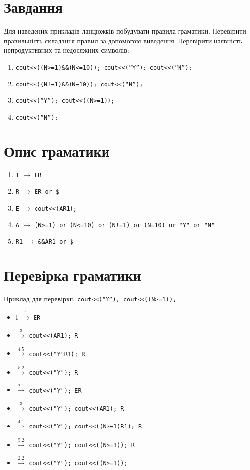 \section{Завдання}
Для наведених прикладів ланцюжків побудувати правила граматики.
Перевірити правильність складання правил за допомогою виведення.
Перевірити наявність непродуктивних та недосяжних символів:

\begin{enumerate}
    \item \verb|cout<<((N>=1)&&(N<=10)); cout<<(“Y”); cout<<(“N”);|
    \item \verb|cout<<((N!=1)&&(N=10)); cout<<(“N”);|
    \item \verb|cout<<(“Y”); cout<<((N>=1));|
    \item \verb|cout<<(“N”);|
\end{enumerate}

\section{Опис граматики}
\begin{enumerate}
    \item  \verb|I| $\to$ \verb|ER|
    \item  \verb|R| $\to$ \verb|ER or $|
    \item  \verb|E| $\to$ \verb|cout<<(AR1);|
    \item  \verb|A| $\to$ \verb|(N>=1) or (N<=10) or (N!=1) or (N=10) or "Y" or "N"|
    \item  \verb|R1| $\to$ \verb|&&AR1 or $|
\end{enumerate}


\newpage
\section{Перевірка граматики}
Приклад для перевірки: \verb|cout<<(“Y”); cout<<((N>=1));|
\begin{itemize}
    \item[]  I $\xrightarrow{1}$ \verb|ER|
    \item[]  $\xrightarrow{3}$ \verb|cout<<(AR1); R|
    \item[]  $\xrightarrow{4.5}$ \verb|cout<<("Y"R1); R|
    \item[]  $\xrightarrow{5.2}$ \verb|cout<<("Y"); R|
    \item[]  $\xrightarrow{2.1}$ \verb|cout<<("Y"); ER|
    \item[]  $\xrightarrow{3}$ \verb|cout<<("Y"); cout<<(AR1); R|
    \item[]  $\xrightarrow{4.1}$ \verb|cout<<("Y"); cout<<((N>=1)R1); R|
    \item[]  $\xrightarrow{5.2}$ \verb|cout<<("Y"); cout<<((N>=1)); R|
    \item[]  $\xrightarrow{2.2}$ \verb|cout<<("Y"); cout<<((N>=1));|
\end{itemize}

